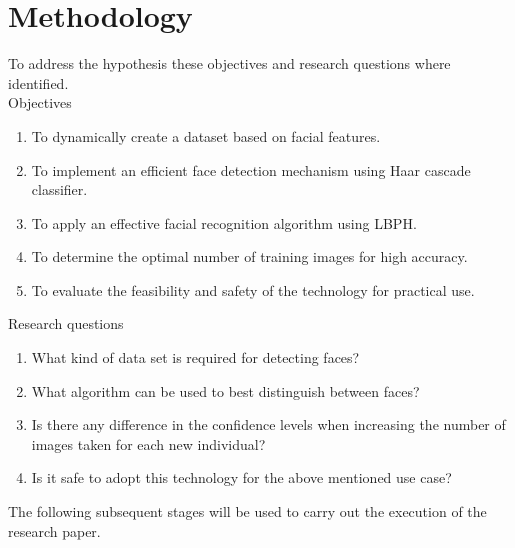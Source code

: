 \documentclass[journal]{IEEEtran}
\begin{document}
\section{Methodology}
To address the hypothesis these objectives and research questions where identified.\\
Objectives
\begin{enumerate}
  \item To dynamically create a dataset based on facial features.
  \item To implement an efficient face detection mechanism using Haar cascade classifier.
  \item To apply an effective facial recognition algorithm using LBPH.
  \item To determine the optimal number of training images for high accuracy. 
  \item To evaluate the feasibility and safety of the technology for practical use.
\end{enumerate}
Research questions 
\begin{enumerate}
  \item What kind of data set is required for detecting faces?
  \item What algorithm can be used to best distinguish between faces?
  \item Is there any difference in the confidence levels when increasing the number of images taken for each new individual?
  \item Is it safe to adopt this technology for the above mentioned use case? 
\end{enumerate}

The following subsequent stages will be used to carry out the execution of the research paper.
\end{document}

